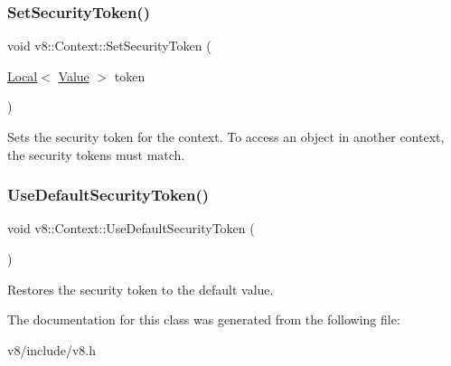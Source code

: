 \subsubsection{\texorpdfstring{Set\+Security\+Token()}{SetSecurityToken()}}
{\footnotesize\ttfamily void v8\+::\+Context\+::\+Set\+Security\+Token (\begin{DoxyParamCaption}\item[{\mbox{\hyperlink{classv8_1_1Local}{Local}}$<$ \mbox{\hyperlink{classv8_1_1Value}{Value}} $>$}]{token }\end{DoxyParamCaption})}

Sets the security token for the context. To access an object in another context, the security tokens must match. \mbox{\label{classv8_1_1Context_aa9e1a14982b64fd51ab87600a287bad2}} 
\subsubsection{\texorpdfstring{Use\+Default\+Security\+Token()}{UseDefaultSecurityToken()}}
{\footnotesize\ttfamily void v8\+::\+Context\+::\+Use\+Default\+Security\+Token (\begin{DoxyParamCaption}{ }\end{DoxyParamCaption})}

Restores the security token to the default value. 

The documentation for this class was generated from the following file\+:\begin{DoxyCompactItemize}
\item 
v8/include/v8.\+h\end{DoxyCompactItemize}
